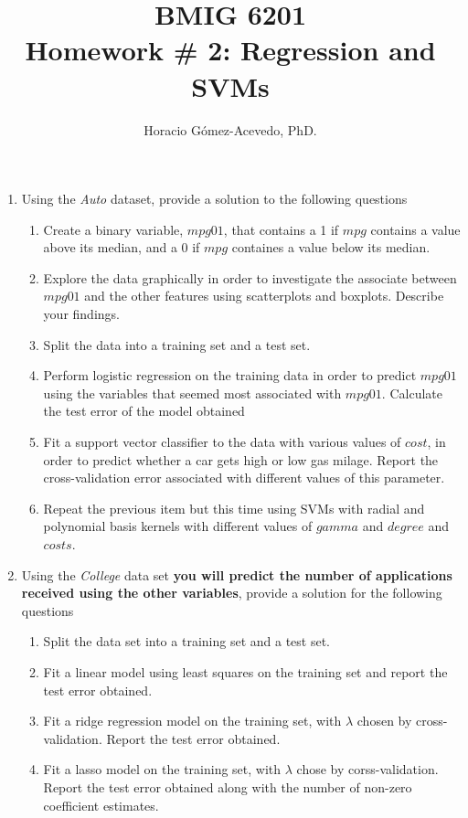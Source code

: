\documentclass[]{article}
\title{BMIG 6201\\
Homework \# 2: Regression and SVMs}
\author{Horacio G\'omez-Acevedo, PhD.}
\begin{document}
\maketitle

\begin{enumerate}
	\item Using the {\it Auto} dataset, provide a solution to the following questions
	\begin{enumerate}
		\item Create a binary variable, $mpg01$, that contains a 1 if $mpg$ contains a value above its median, and a 0 if $mpg$ containes a value below its median. 
		\item Explore the data graphically in order to investigate the associate between $mpg01$ and the other features using scatterplots and boxplots. Describe your findings.
		\item Split the data into a training set and a test set. 
		\item Perform logistic regression on the training data in order to predict $mpg01$ using the variables that seemed most associated with $mpg01$. Calculate the test error of the model obtained
		\item Fit a support vector classifier to the data with various values of $cost$, in order to predict whether a car gets high or low gas milage. Report the cross-validation error associated with different values of this parameter.
		\item Repeat the previous item but this time using SVMs with radial and polynomial basis kernels with different values of $gamma$ and $degree$ and $costs$. 
	
	\end{enumerate}
	\item Using the {\it College} data set {\bf you will predict the number of applications received using the other variables}, provide a solution for the following questions
	\begin{enumerate}
		\item Split the data set into a training set and a test set.
		\item Fit a linear model using least squares on the training set and report the test error obtained.
		\item Fit a ridge regression model on the training set, with $\lambda$ chosen by cross-validation. Report the test error obtained.
		\item Fit a lasso model on the training set, with $\lambda$ chose by corss-validation. Report the test error obtained along with the number of non-zero coefficient estimates.
		
	\end{enumerate}
\end{enumerate}
\end{document}
